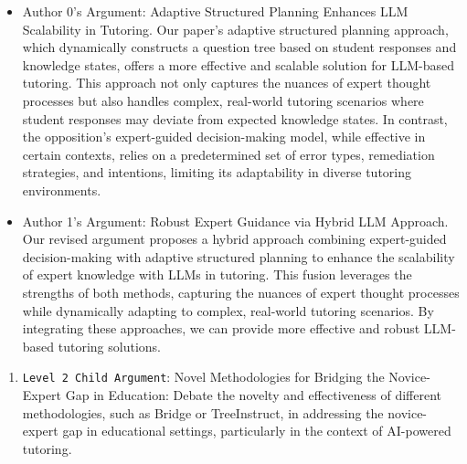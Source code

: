 \begin{enumerate}
\begin{enumerate}
        \begin{itemize}
            \item Author 0's Argument: Adaptive Structured Planning Enhances LLM Scalability in Tutoring. Our paper's adaptive structured planning approach, which dynamically constructs a question tree based on student responses and knowledge states, offers a more effective and scalable solution for LLM-based tutoring. This approach not only captures the nuances of expert thought processes but also handles complex, real-world tutoring scenarios where student responses may deviate from expected knowledge states. In contrast, the opposition's expert-guided decision-making model, while effective in certain contexts, relies on a predetermined set of error types, remediation strategies, and intentions, limiting its adaptability in diverse tutoring environments.
		\item Author 1's Argument: Robust Expert Guidance via Hybrid LLM Approach. Our revised argument proposes a hybrid approach combining expert-guided decision-making with adaptive structured planning to enhance the scalability of expert knowledge with LLMs in tutoring. This fusion leverages the strengths of both methods, capturing the nuances of expert thought processes while dynamically adapting to complex, real-world tutoring scenarios. By integrating these approaches, we can provide more effective and robust LLM-based tutoring solutions.
        \end{itemize}
    \end{enumerate}

    \begin{enumerate}
        \item \texttt{Level 2 Child Argument}: Novel Methodologies for Bridging the Novice-Expert Gap in Education: Debate the novelty and effectiveness of different methodologies, such as Bridge or TreeInstruct, in addressing the novice-expert gap in educational settings, particularly in the context of AI-powered tutoring.


\end{enumerate}
\end{enumerate}
